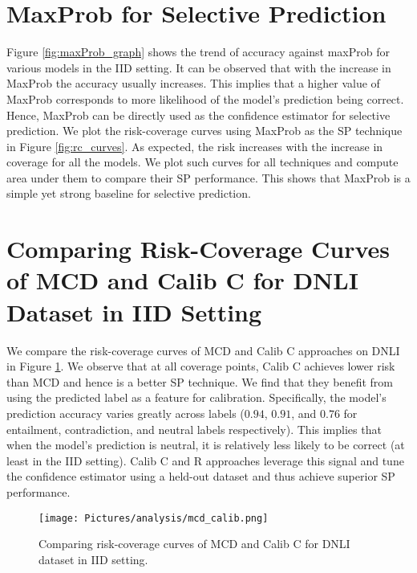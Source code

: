\documentclass[11pt]{article}
\begin{document}

\section{MaxProb for Selective Prediction}
Figure \ref{fig:maxProb_graph} shows the trend of accuracy against maxProb for various models in the IID setting.
It can be observed that with the increase in MaxProb the accuracy usually increases. 
This implies that a higher value of MaxProb corresponds to more likelihood of the model's prediction being correct.
Hence, MaxProb can be directly used as the confidence estimator for selective prediction.
We plot the risk-coverage curves using MaxProb as the SP technique in Figure \ref{fig:rc_curves}.
As expected, the risk increases with the increase in coverage for all the models.
We plot such curves for all techniques and compute area under them to compare their SP performance.
This shows that MaxProb is a simple yet strong baseline for selective prediction.


\section{Comparing Risk-Coverage Curves of MCD and Calib C for DNLI Dataset in IID Setting}
We compare the risk-coverage curves of MCD and Calib C approaches on DNLI in Figure \ref{fig:mcd_calib_analyze}.
We observe that at all coverage points, Calib C achieves lower risk than MCD and hence is a better SP technique.
We find that they benefit from using the predicted label as a feature for calibration.
Specifically, the model's prediction accuracy varies greatly across labels ($0.94$, $0.91$, and $0.76$ for entailment, contradiction, and neutral labels respectively).
This implies that when the model's prediction is neutral, it is relatively less likely to be correct (at least in the IID setting). 
Calib C and R approaches leverage this signal and tune the confidence estimator using a held-out dataset and thus achieve superior SP performance.

\begin{figure}
    \centering
    \texttt{[image: Pictures/analysis/mcd\_calib.png]}
    \caption{Comparing risk-coverage curves of MCD and Calib C for DNLI dataset in IID setting.}
    \label{fig:mcd_calib_analyze}
\end{figure}
\end{document}
